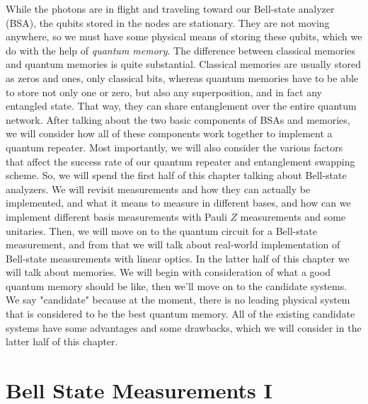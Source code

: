 While the photons are in flight and traveling toward our Bell-state analyzer (BSA), the qubits stored in the nodes are stationary. They are not moving anywhere, so we must have some physical means of storing these qubits, which we do with the help of \emph{quantum memory}. The difference between classical memories and quantum memories is quite substantial. Classical memories are usually stored as zeros and ones, only classical bits, whereas quantum memories have to be able to store not only one or zero, but also any superposition, and in fact any entangled state. That way, they can share entanglement over the entire quantum network. After talking about the two basic components of BSAs and memories, we will consider how all of these components work together to implement a quantum repeater. Most importantly, we will also consider the various factors that affect the success rate of our quantum repeater and entanglement swapping scheme. So, we will spend the first half of this chapter talking about Bell-state analyzers. We will revisit measurements and how they can actually be implemented, and what it means to measure in different bases, and how can we implement different basis measurements with Pauli $Z$ measurements and some unitaries. Then, we will move on to the quantum circuit for a Bell-state measurement, and from that we will talk about real-world implementation of Bell-state measurements with linear optics.  In the latter half of this chapter we will talk about memories. We will begin with consideration of what a good quantum memory should be like, then we'll move on to the candidate systems.  We say "candidate" because at the moment, there is no leading physical system that is considered to be the best quantum memory. All of the existing candidate systems have some advantages and some drawbacks, which we will consider in the latter half of this chapter.



\section{Bell State Measurements I}

